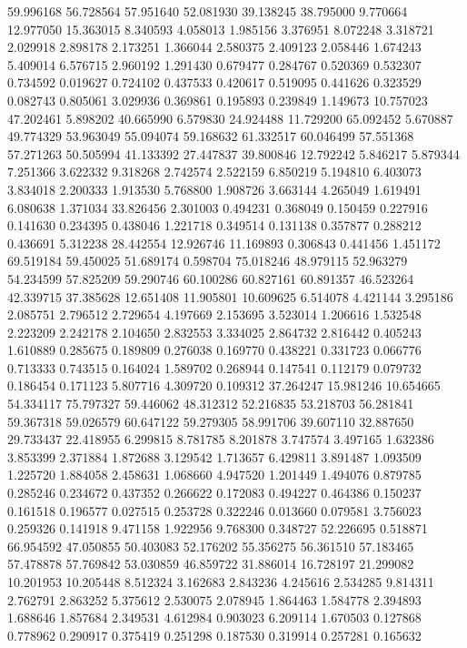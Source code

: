 59.996168
56.728564
57.951640
52.081930
39.138245
38.795000
9.770664
12.977050
15.363015
8.340593
4.058013
1.985156
3.376951
8.072248
3.318721
2.029918
2.898178
2.173251
1.366044
2.580375
2.409123
2.058446
1.674243
5.409014
6.576715
2.960192
1.291430
0.679477
0.284767
0.520369
0.532307
0.734592
0.019627
0.724102
0.437533
0.420617
0.519095
0.441626
0.323529
0.082743
0.805061
3.029936
0.369861
0.195893
0.239849
1.149673
10.757023
47.202461
5.898202
40.665990
6.579830
24.924488
11.729200
65.092452
5.670887
49.774329
53.963049
55.094074
59.168632
61.332517
60.046499
57.551368
57.271263
50.505994
41.133392
27.447837
39.800846
12.792242
5.846217
5.879344
7.251366
3.622332
9.318268
2.742574
2.522159
6.850219
5.194810
6.403073
3.834018
2.200333
1.913530
5.768800
1.908726
3.663144
4.265049
1.619491
6.080638
1.371034
33.826456
2.301003
0.494231
0.368049
0.150459
0.227916
0.141630
0.234395
0.438046
1.221718
0.349514
0.131138
0.357877
0.288212
0.436691
5.312238
28.442554
12.926746
11.169893
0.306843
0.441456
1.451172
69.519184
59.450025
51.689174
0.598704
75.018246
48.979115
52.963279
54.234599
57.825209
59.290746
60.100286
60.827161
60.891357
46.523264
42.339715
37.385628
12.651408
11.905801
10.609625
6.514078
4.421144
3.295186
2.085751
2.796512
2.729654
4.197669
2.153695
3.523014
1.206616
1.532548
2.223209
2.242178
2.104650
2.832553
3.334025
2.864732
2.816442
0.405243
1.610889
0.285675
0.189809
0.276038
0.169770
0.438221
0.331723
0.066776
0.713333
0.743515
0.164024
1.589702
0.268944
0.147541
0.112179
0.079732
0.186454
0.171123
5.807716
4.309720
0.109312
37.264247
15.981246
10.654665
54.334117
75.797327
59.446062
48.312312
52.216835
53.218703
56.281841
59.367318
59.026579
60.647122
59.279305
58.991706
39.607110
32.887650
29.733437
22.418955
6.299815
8.781785
8.201878
3.747574
3.497165
1.632386
3.853399
2.371884
1.872688
3.129542
1.713657
6.429811
3.891487
1.093509
1.225720
1.884058
2.458631
1.068660
4.947520
1.201449
1.494076
0.879785
0.285246
0.234672
0.437352
0.266622
0.172083
0.494227
0.464386
0.150237
0.161518
0.196577
0.027515
0.253728
0.322246
0.013660
0.079581
3.756023
0.259326
0.141918
9.471158
1.922956
9.768300
0.348727
52.226695
0.518871
66.954592
47.050855
50.403083
52.176202
55.356275
56.361510
57.183465
57.478878
57.769842
53.030859
46.859722
31.886014
16.728197
21.299082
10.201953
10.205448
8.512324
3.162683
2.843236
4.245616
2.534285
9.814311
2.762791
2.863252
5.375612
2.530075
2.078945
1.864463
1.584778
2.394893
1.688646
1.857684
2.349531
4.612984
0.903023
6.209114
1.670503
0.127868
0.778962
0.290917
0.375419
0.251298
0.187530
0.319914
0.257281
0.165632
